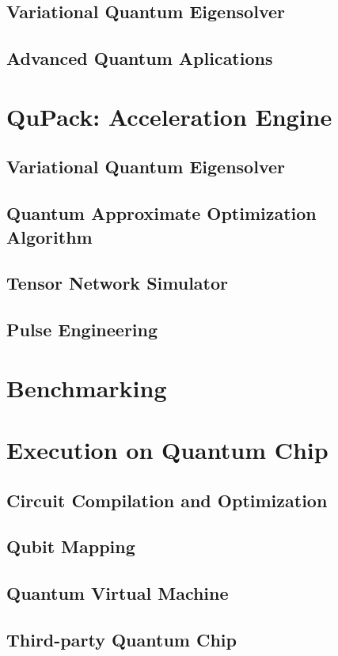 \documentclass[pra,twocolumn,superscriptaddress,floatfix,nofootinbib,amsmath,amssymb]{revtex4-1}
\begin{document}
\subsection{Variational Quantum Eigensolver}


\subsection{Advanced Quantum Aplications}



\section{QuPack: Acceleration Engine}


\subsection{Variational Quantum Eigensolver}


\subsection{Quantum Approximate Optimization Algorithm}


\subsection{Tensor Network Simulator}


\subsection{Pulse Engineering}



\section{Benchmarking}



\section{Execution on Quantum Chip}


\subsection{Circuit Compilation and Optimization}


\subsection{Qubit Mapping}


\subsection{Quantum Virtual Machine}


\subsection{Third-party Quantum Chip}




\end{document}
